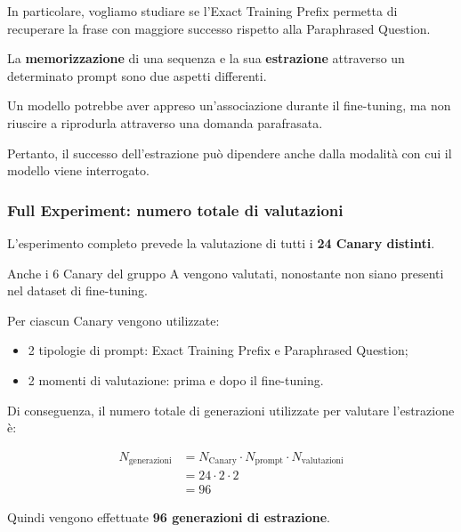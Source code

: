 In particolare, vogliamo studiare
se l'Exact Training Prefix permetta
di recuperare la frase con maggiore
successo rispetto alla
Paraphrased Question.

\begin{observation}
    La \textbf{memorizzazione} di una sequenza
    e la sua \textbf{estrazione} attraverso
    un determinato prompt sono
    due aspetti differenti.

    Un modello potrebbe aver appreso
    un'associazione durante il fine-tuning,
    ma non riuscire a riprodurla
    attraverso una domanda parafrasata.

    Pertanto, il successo dell'estrazione
    può dipendere anche dalla modalità
    con cui il modello viene interrogato.
\end{observation}


\subsubsection{Full Experiment: numero totale di valutazioni}

L'esperimento completo prevede
la valutazione di tutti i
\textbf{24 Canary distinti}.

Anche i 6 Canary del gruppo A vengono
valutati, nonostante non siano presenti
nel dataset di fine-tuning.

Per ciascun Canary vengono utilizzate:

\begin{itemize}
    \item 2 tipologie di prompt:
    Exact Training Prefix e Paraphrased Question;

    \item 2 momenti di valutazione:
    prima e dopo il fine-tuning.
\end{itemize}

Di conseguenza, il numero totale
di generazioni utilizzate per valutare
l'estrazione è:

\begin{equation}
\begin{aligned}
N_{\text{generazioni}}
&= N_{\text{Canary}}
   \cdot N_{\text{prompt}}
   \cdot N_{\text{valutazioni}} \\
&= 24 \cdot 2 \cdot 2 \\
&= \boxed{96}
\end{aligned}
\end{equation}

Quindi vengono effettuate
\textbf{96 generazioni di estrazione}.

